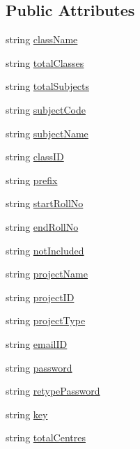 \subsection*{\-Public \-Attributes}
\begin{DoxyCompactItemize}
\item 
string \hyperlink{classInputFieldName_ad8b28ebeabdabb5967542e317f549280}{class\-Name}
\item 
string \hyperlink{classInputFieldName_a5bf413dee6dcf29c1872e93f150d48c0}{total\-Classes}
\item 
string \hyperlink{classInputFieldName_ac58130077f39d82aaf447b1a67e9f70f}{total\-Subjects}
\item 
string \hyperlink{classInputFieldName_af1cc6871c33344c365e6e25ea482bd48}{subject\-Code}
\item 
string \hyperlink{classInputFieldName_a0614731b959afef6bb00f9fc957e7521}{subject\-Name}
\item 
string \hyperlink{classInputFieldName_a6a67c361f3b631fb6c3620c14a615fb9}{class\-I\-D}
\item 
string \hyperlink{classInputFieldName_a161d155f8faca2c5dea1bbd607b17553}{prefix}
\item 
string \hyperlink{classInputFieldName_a24baf5c915b4ee0fb8678e03adec043a}{start\-Roll\-No}
\item 
string \hyperlink{classInputFieldName_a06435f9ba5a529cbba4ee1ce9b02e5cc}{end\-Roll\-No}
\item 
string \hyperlink{classInputFieldName_a9ee6ee84737e1199bdfd9fb24c82c2c7}{not\-Included}
\item 
string \hyperlink{classInputFieldName_ab93b034743570810afe89aea88a7bbf6}{project\-Name}
\item 
string \hyperlink{classInputFieldName_ac4bd117f3137956473f1a1d5ce9106a5}{project\-I\-D}
\item 
string \hyperlink{classInputFieldName_aaa398a603dfe98f4eca022ec9d90bc09}{project\-Type}
\item 
string \hyperlink{classInputFieldName_a05541618feaaebe7a3f74b0bf8fa74b9}{email\-I\-D}
\item 
string \hyperlink{classInputFieldName_a318f819ef4663d7e5f40d91180093cb9}{password}
\item 
string \hyperlink{classInputFieldName_acd50095ae8540a735bcd5787b904b06c}{retype\-Password}
\item 
string \hyperlink{classInputFieldName_a26cffcb455cb1b977aa60b68c5b48fe4}{key}
\item 
string \hyperlink{classInputFieldName_af88ac102ec3a4adbb9edc7c3d61919cb}{total\-Centres}

\end{DoxyCompactItemize}
